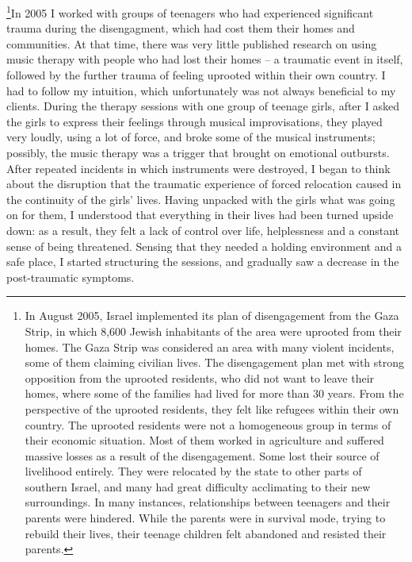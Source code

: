 \documentclass[authordate, empirical, issue]{jote-new-article}
\begin{document}
\footnote{ In August 2005, Israel implemented its plan of disengagement from the Gaza Strip, in which 8,600 Jewish inhabitants of the area were uprooted from their homes. The Gaza Strip was considered an area with many violent incidents, some of them claiming civilian lives. The disengagement plan met with strong opposition from the uprooted residents, who did not want to leave their homes, where some of the families had lived for more than 30 years. From the perspective of the uprooted residents, they felt like refugees within their own country. The uprooted residents were not a homogeneous group in terms of their economic situation. Most of them worked in agriculture and suffered massive losses as a result of the disengagement. Some lost their source of livelihood entirely. They were relocated by the state to other parts of southern Israel, and many had great difficulty acclimating to their new surroundings. In many instances, relationships between teenagers and their parents were hindered. While the parents were in survival mode, trying to rebuild their lives, their teenage children felt abandoned and resisted their parents. }In 2005 I worked with groups of teenagers who had experienced significant trauma during the disengagment, which had cost them their homes and communities. At that time, there was very little published research on using music therapy with people who had lost their homes -- a traumatic event in itself, followed by the further trauma of feeling uprooted within their own country. I had to follow my intuition, which unfortunately was not always beneficial to my clients. During the therapy sessions with one group of teenage girls, after I asked the girls to express their feelings through musical improvisations, they played very loudly, using a lot of force, and broke some of the musical instruments; possibly, the music therapy was a trigger that brought on emotional outbursts. After repeated incidents in which instruments were destroyed, I began to think about the disruption that the traumatic experience of forced relocation caused in the continuity of the girls' lives. Having unpacked with the girls what was going on for them, I understood that everything in their lives had been turned upside down: as a result, they felt a lack of control over life, helplessness and a constant sense of being threatened. Sensing that they needed a holding environment and a safe place, I started structuring the sessions, and gradually saw a decrease in the post-traumatic symptoms.
\end{document}
